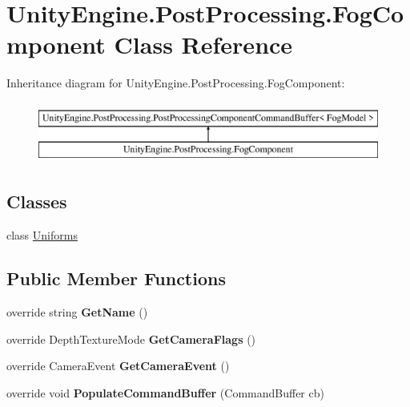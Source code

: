 \hypertarget{class_unity_engine_1_1_post_processing_1_1_fog_component}{}\section{Unity\+Engine.\+Post\+Processing.\+Fog\+Component Class Reference}
\label{class_unity_engine_1_1_post_processing_1_1_fog_component}
Inheritance diagram for Unity\+Engine.\+Post\+Processing.\+Fog\+Component\+:\begin{figure}[H]
\begin{center}
\leavevmode
\includegraphics[height=2.000000cm]{class_unity_engine_1_1_post_processing_1_1_fog_component}
\end{center}
\end{figure}
\subsection*{Classes}
\begin{DoxyCompactItemize}
\item 
class \hyperlink{class_unity_engine_1_1_post_processing_1_1_fog_component_1_1_uniforms}{Uniforms}
\end{DoxyCompactItemize}
\subsection*{Public Member Functions}
\begin{DoxyCompactItemize}
\item 
\mbox{\label{class_unity_engine_1_1_post_processing_1_1_fog_component_acf525749b7d7e54b04a111681b386628}} 
override string {\bfseries Get\+Name} ()
\item 
\mbox{\label{class_unity_engine_1_1_post_processing_1_1_fog_component_a91738868bb041aaecca8adcf75c148c3}} 
override Depth\+Texture\+Mode {\bfseries Get\+Camera\+Flags} ()
\item 
\mbox{\label{class_unity_engine_1_1_post_processing_1_1_fog_component_a6b9fae58f8772759a33c8050ea443195}} 
override Camera\+Event {\bfseries Get\+Camera\+Event} ()
\item 
\mbox{\label{class_unity_engine_1_1_post_processing_1_1_fog_component_a069c63fdf3cc8cc505508db2671948ac}} 
override void {\bfseries Populate\+Command\+Buffer} (Command\+Buffer cb)
\end{DoxyCompactItemize}
